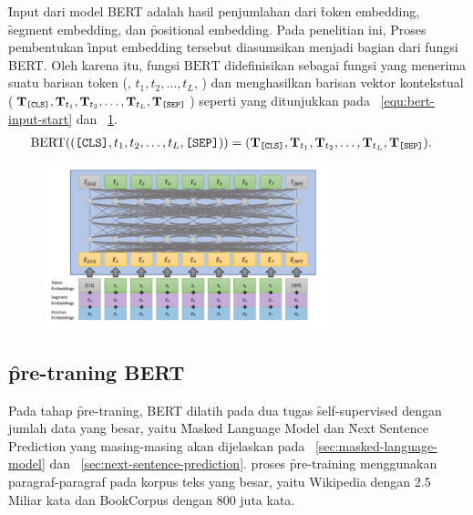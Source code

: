\f{Input} dari model BERT adalah hasil penjumlahan dari \f{token embedding}, \f{segment embedding}, dan \f{positional embedding}. Pada penelitian ini, Proses pembentukan \f{input embedding} tersebut diasumsikan menjadi bagian dari fungsi BERT. Oleh karena itu, fungsi $\text{BERT}$ didefinisikan sebagai fungsi yang menerima suatu barisan token (\code{[CLS]}, $t_1, t_2, \dots, t_L$, \code{[SEP]}) dan menghasilkan barisan vektor kontekstual ($\mathbf{T}_{\text{\texttt{[CLS]}}}, \mathbf{T}_{t_1}, \mathbf{T}_{t_2}, \dots, \mathbf{T}_{t_L}, \mathbf{T}_{\text{\texttt{[SEP]}}}$) seperti yang ditunjukkan pada \equ~\ref{equ:bert-input-start} dan \pic~\ref{fig:input-representation}.
\begin{align}
	\label{equ:bert-input-start}
	\text{BERT}((\text{\texttt{[CLS]}}, t_1, t_2, \dots, t_L, \text{\texttt{[SEP]}})) &= (\mathbf{T}_{\text{\texttt{[CLS]}}}, \mathbf{T}_{t_1}, \mathbf{T}_{t_2}, \dots, \mathbf{T}_{t_L}, \mathbf{T}_{\text{\texttt{[SEP]}}}).
\end{align}
\begin{figure}
	\centering
	\includegraphics[width=0.75\textwidth]{assets/pics/representasibert.png}
	\label{fig:input-representation}
\end{figure}

\subsection{\f{pre-traning} BERT}

	Pada tahap \f{pre-traning}, BERT dilatih pada dua tugas \f{self-supervised} dengan jumlah data yang besar, yaitu \f{Masked Language Model} dan \f{Next Sentence Prediction} yang masing-masing akan dijelaskan pada \sect~\ref{sec:masked-language-model} dan \sect~\ref{sec:next-sentence-prediction}. proses \f{pre-training} menggunakan paragraf-paragraf pada korpus teks yang besar, yaitu Wikipedia dengan 2.5 Miliar kata dan BookCorpus dengan 800 juta kata.


